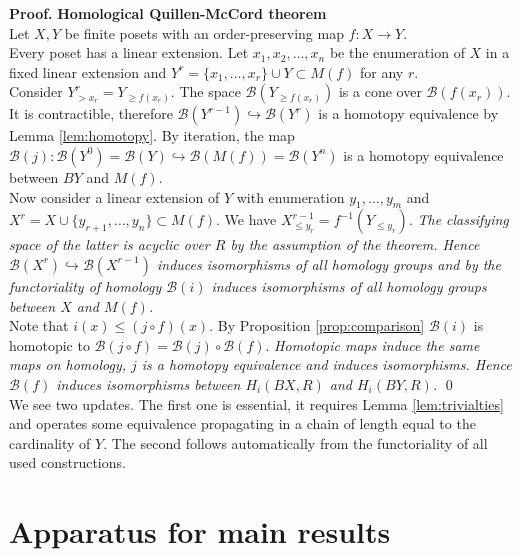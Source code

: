 \documentclass[english,12pt]{article}
\numberwithin{equation}{section}
\theoremstyle{definition}
\theoremstyle{remark}
\newenvironment{pf}{\noindent\textbf{Proof.}}{\qed}
\renewcommand{\leq}{\leqslant}
\renewcommand{\geq}{\geqslant}
\begin{document}
\begin{pf} \textbf{Homological Quillen-McCord theorem}\\
Let $X, Y$ be finite posets with an order-preserving map $f : X \to Y$.\\

Every poset has a linear extension. Let $x_1, x_2, \ldots, x_n$ be the enumeration of $X$ in a fixed linear extension and $Y^r = \{x_1,\ldots,x_r\} \cup Y \subset M(f)$ for any $r$.\\

Consider $Y^r_{>x_r} = Y_{\geq f(x_r)}$. The space $\mathcal{B}(Y_{\geq f(x_r)})$ is a cone over $\mathcal{B}(f(x_r))$. It is contractible, therefore $\mathcal{B}(Y^{r-1}) \hookrightarrow \mathcal{B}(Y^{r})$ is a homotopy equivalence by Lemma \ref{lem:homotopy}. By iteration, the map $\mathcal{B}(j) : \mathcal{B}(Y^{0}) = \mathcal{B}(Y) \hookrightarrow \mathcal{B}(M(f)) = \mathcal{B}(Y^n)$ is a homotopy equivalence between $BY$ and $M(f)$.\\

Now consider a linear extension of $Y$ with enumeration $y_1,\ldots,y_m$ and $X^r = X \cup \{y_{r+1},\ldots,y_n\} \subset M(f)$. We have $X^{r-1}_{\leq y_r} = f^{-1}(Y_{\leqslant y_r})$. \textit{The classifying space of the latter is acyclic over $R$ by the assumption of the theorem. Hence $\mathcal{B}(X^{r}) \hookrightarrow \mathcal{B}(X^{r-1})$ induces isomorphisms of all homology groups and by the functoriality of homology $\mathcal{B}(i)$ induces isomorphisms of all homology groups between $X$ and $M(f)$.}\\

Note that $i(x) \leqslant (j \circ f)(x)$. By Proposition \ref{prop:comparison} $\mathcal{B}(i)$ is homotopic to $\mathcal{B}(j \circ f) = \mathcal{B}(j) \circ \mathcal{B}(f)$. \textit{Homotopic maps induce the same maps on homology, $j$ is a homotopy equivalence and induces isomorphisms. Hence $\mathcal{B}(f)$ induces isomorphisms between $H_i(BX,R)$ and $H_i(BY,R)$.}
\end{pf}\\

We see two updates. The first one is essential, it requires Lemma \ref{lem:trivialties} and operates some equivalence propagating in a chain of length equal to the cardinality of $Y$. The second follows automatically from the functoriality of all used constructions.

\section{Apparatus for main results}
\end{document}
